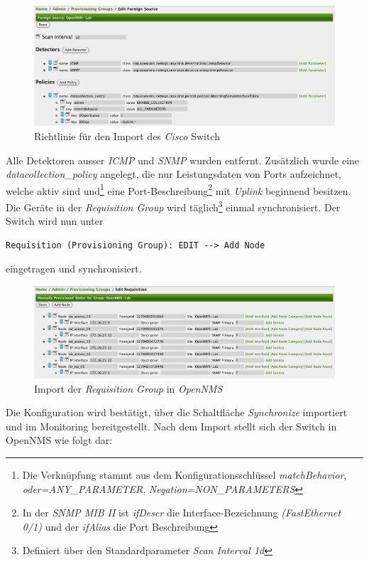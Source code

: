 \begin{figure}[H]
	\centering
	\includegraphics[width=1.0\textwidth]{images/use-cases/monitoring-layer-2/requisition-policy}
	\caption{Richtlinie für den Import des \textit{Cisco} Switch}
	\label{pic:requisition-policy}
\end{figure}
Alle Detektoren ausser \textit{ICMP} und \textit{SNMP} wurden entfernt. Zusätzlich wurde eine \textit{datacollection\_policy} angelegt, die nur Leistungsdaten von Ports aufzeichnet, welche aktiv sind und\footnote{Die Verknüpfung stammt aus dem Konfigurationsschlüssel \textit{matchBehavior}, \textit{oder=ANY\_PARAMETER}, \textit{Negation=NON\_PARAMETERS}} eine Port-Beschreibung\footnote{In der \textit{SNMP MIB II} ist \textit{ifDescr} die Interface-Bezeichnung \textit{(FastEthernet 0/1)} und der \textit{ifAlias} die Port Beschreibung} mit \textit{Uplink} beginnend besitzen. Die Geräte in der \textit{Requisition Group} wird täglich\footnote{Definiert über den Standardparameter \textit{Scan Interval 1d}} einmal synchronisiert. Der Switch wird nun unter 
\begin{lstlisting}[numbers=none]
Requisition (Provisioning Group): EDIT --> Add Node
\end{lstlisting}
eingetragen und synchronisiert.
\begin{figure}[H]
	\centering
	\includegraphics[width=1.0\textwidth]{images/use-cases/monitoring-layer-2/requisition-import}
	\caption{Import der \textit{Requisition Group} in \textit{OpenNMS}}
	\label{pic:requisition-import}
\end{figure}
Die Konfiguration wird bestätigt, über die Schaltfläche \textit{Synchronize} importiert und im Monitoring bereitgestellt. Nach dem Import stellt sich der Switch in OpenNMS wie folgt dar:
